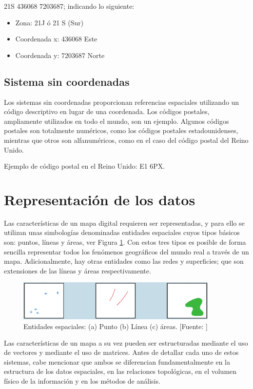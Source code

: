 21S 436068 7203687; indicando lo siguiente:

\begin{itemize}
    \item Zona: 21J ó 21 S (Sur)
    \item Coordenada x: 436068 Este
    \item Coordenada y: 7203687 Norte
\end{itemize}

\subsection{Sistema sin coordenadas}
Los sistemas sin coordenadas proporcionan referencias espaciales utilizando un código descriptivo en lugar de una coordenada. Los códigos postales, ampliamente utilizados en todo el mundo, son un ejemplo. Algunos códigos postales son totalmente numéricos, como los códigos postales estadounidenses, mientras que otros son alfanuméricos, como en el caso del código postal del Reino Unido.

Ejemplo de código postal en el Reino Unido: E1 6PX.

\section{Representación de los datos}

Las características de un mapa digital requieren ser representadas, y para ello se utilizan unas simbologías denominadas entidades espaciales cuyos tipos básicos son: puntos, líneas y áreas, ver Figura \ref{fig:entidadesPuntoLineaPoligono}. Con estos tres tipos es posible de forma sencilla representar todos los fenómenos geográficos del mundo real a través de un mapa. Adicionalmente, hay otras entidades como las redes y superficies; que son extensiones de las líneas y áreas respectivamente.

\begin{figure}[H]
    \centering
    \includegraphics[width=10cm]{entidadesGeometricas.png}
    \caption{Entidades espaciales: (a) Punto (b) Línea (c) áreas. [Fuente: ]}
    \label{fig:entidadesPuntoLineaPoligono}
\end{figure}

Las características de un mapa a su vez pueden ser estructuradas mediante el uso de vectores y mediante el uso de matrices. Antes de detallar cada uno de estos sistemas, cabe mencionar que ambos se diferencian fundamentalmente en la estructura de los datos espaciales, en las relaciones topológicas, en el volumen físico de la información y en los métodos de análisis.

